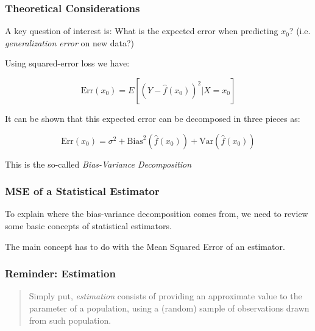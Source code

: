 \documentclass[12pt]{beamer}\usepackage[]{graphicx}\usepackage[]{color}
\begin{document}

\begin{frame}
\frametitle{Theoretical Considerations}

A key question of interest is: What is the expected error when predicting $x_0$?
(i.e. \textit{generalization error} on new data?)

\bigskip
Using squared-error loss we have:

$$
\text{Err}(x_0) = E[(Y - \hat{f}(x_0))^2 | X = x_0]
$$

It can be shown that this expected error can be decomposed in three pieces as:

$$
\text{Err}(x_0) = \sigma^2 + \text{Bias}^2(\hat{f}(x_0)) + \text{Var}(\hat{f}(x_0))
$$

{\mdlit This is the so-called \textit{Bias-Variance Decomposition}}

\end{frame}


\begin{frame}
\frametitle{MSE of a Statistical Estimator}

To explain where the bias-variance decomposition comes from, we need to
review some basic concepts of statistical estimators.

\bigskip
The main concept has to do with the Mean Squared Error of an estimator.

\end{frame}


\begin{frame}
\begin{center}
\Huge{}
\end{center}
\end{frame}


\begin{frame}
\frametitle{Reminder: Estimation}

{\large
\begin{quotation}
\noindent Simply put, \textit{estimation} consists of providing an approximate value
to the parameter of a population, using a (random) sample of observations 
drawn from such population.
\end{quotation}
}

\end{frame}
\end{document}
